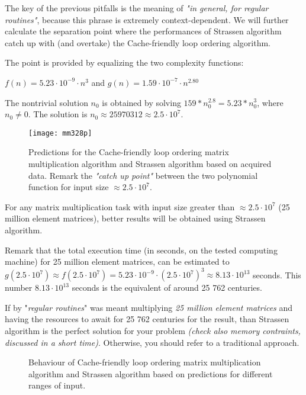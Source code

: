 The key of the previous pitfalls is the meaning of \textit{"in general, for regular routines"}, because this phrase is extremely context-dependent. We will further calculate the separation point where the performances of Strassen algorithm catch up with (and overtake) the Cache-friendly loop ordering algorithm.

The point is provided by equalizing the two complexity functions:

$f(n) = 5.23 \cdot 10^{-9} \cdot n^{3} $ and $g(n) = 1.59 \cdot 10^{-7} \cdot n^{2.80} $

The nontrivial solution $n_{0}$ is obtained by solving $ 159 * n_{0}^{2.8} = 5.23* n_{0}^3 $, where $n_{0} \neq 0$. The solution is $n_{0} \approx 25970312 \approx 2.5 \cdot 10^7$.

\begin{figure}[H]
\centering
\texttt{[image: mm328p]}
\caption{Predictions for the Cache-friendly loop ordering matrix multiplication algorithm and Strassen algorithm based on acquired data. Remark the \textit{"catch up point"} between the two polynomial function for input size $\approx 2.5 \cdot 10^7$. }
\end{figure}

For any matrix multiplication task with input size greater than $\approx 2.5 \cdot 10^7$ (25 million element matrices), better results will be obtained using Strassen algorithm.

Remark that the total execution time (in seconds, on the tested computing machine) for 25 million element matrices, can be estimated to $g(2.5 \cdot 10^7) \approx f(2.5 \cdot 10^7) = 5.23 \cdot 10^{-9} \cdot (2.5 \cdot 10^7)^{3} \approx 8.13 \cdot 10^{13}$ seconds. This number $8.13 \cdot 10^{13} $ seconds is the equivalent of around 25 762 centuries.

If by "\textit{regular routines}" was meant multiplying \textit{25 million element matrices} and having the resources to await for 25 762 centuries for the result, than Strassen algorithm is the perfect solution for your problem \textit{(check also memory contraints, discussed in a short time)}. Otherwise, you should refer to a traditional approach.

\begin{figure}[H]
\caption{Behaviour of Cache-friendly loop ordering matrix multiplication algorithm and Strassen algorithm based on predictions for different ranges of input.}
\end{figure}


